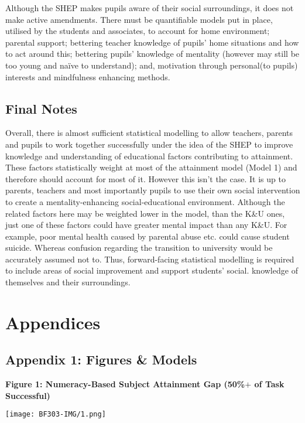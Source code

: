 \documentclass[11pt, english]{article}
\begin{document}
	Although the SHEP makes pupils aware of their social surroundings, it does not make active amendments. There must be quantifiable models put in place, utilised by the students and associates, to account for home environment; parental support; bettering teacher knowledge of pupils' home situations and how to act around this; bettering pupils' knowledge of mentality (however may still be too young and naïve to understand); and, motivation through personal(to pupils) interests and mindfulness enhancing methods.

	\subsection{Final Notes}

	Overall, there is almost sufficient statistical modelling to allow teachers, parents and pupils to work together successfully under the idea of the SHEP to improve knowledge and understanding of educational factors contributing to attainment. These factors statistically weight at most of the attainment model (Model 1) and therefore should account for most of it. However this isn't the case. It is up to parents, teachers and most importantly pupils to use their own social intervention to create a mentality-enhancing social-educational environment. Although the related factors here may be weighted lower in the model, than the K\&U ones, just one of these factors could have greater mental impact than any K\&U. For example, poor mental health caused by parental abuse etc. could cause student suicide. Whereas confusion regarding the transition to university would be accurately assumed not to. Thus, forward-facing statistical modelling is required to include areas of social improvement and support students' social. knowledge of themselves and their surroundings.

\newpage

\section{Appendices}

	\subsection{Appendix 1: Figures \& Models}

	\textbf{Figure 1: Numeracy-Based Subject Attainment Gap (50\%$+$ of Task Successful)}

	\begin{center}
		\texttt{[image: BF303-IMG/1.png]}
	\end{center}
\end{document}
